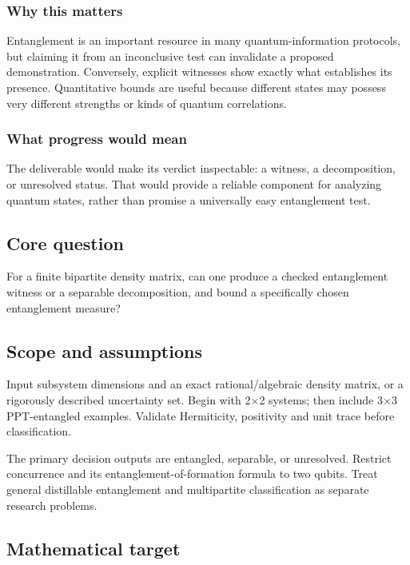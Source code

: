 \documentclass[
  11pt,
]{article}
\begin{document}
\subsubsection{Why this matters}

Entanglement is an important resource in many quantum-information
protocols, but claiming it from an inconclusive test can invalidate a
proposed demonstration. Conversely, explicit witnesses show exactly what
establishes its presence. Quantitative bounds are useful because
different states may possess very different strengths or kinds of
quantum correlations.

\subsubsection{What progress would mean}

The deliverable would make its verdict inspectable: a witness, a
decomposition, or unresolved status. That would provide a reliable
component for analyzing quantum states, rather than promise a
universally easy entanglement test.

\subsection{Core question}

For a finite bipartite density matrix, can one produce a checked
entanglement witness or a separable decomposition, and bound a
specifically chosen entanglement measure?

\subsection{Scope and assumptions}

Input subsystem dimensions and an exact rational/algebraic density
matrix, or a rigorously described uncertainty set. Begin with
2\ensuremath{\times}2 systems; then include 3\ensuremath{\times}3
PPT-entangled examples. Validate Hermiticity, positivity and unit trace
before classification.

The primary decision outputs are entangled, separable, or unresolved.
Restrict concurrence and its entanglement-of-formation formula to two
qubits. Treat general distillable entanglement and multipartite
classification as separate research problems.

\subsection{Mathematical target}
\end{document}
